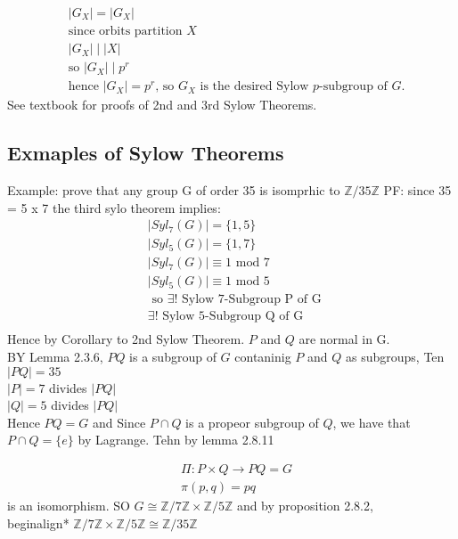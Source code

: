 \documentclass{article}
\begin{document}
\begin{align*}
    & |G_X|  = |G_X|  \\ 
    &  \text{since orbits partition } X \\
    & |G_X| \mid |X| \\ 
    & \text{so } |G_X| \mid p^r \\ 
    & \text{hence } |G_X| = p^r \text{, so } G_X \text{ is the desired Sylow } p \text{-subgroup of } G.
\end{align*}
See textbook for proofs of 2nd and 3rd Sylow Theorems.
\subsection{Exmaples of Sylow Theorems}

Example: prove that any group G of order 35 is isomprhic to $\mathbb{Z} / 35 \mathbb{Z}$ 
PF: since 35 = 5 x 7 the third sylo theorem implies: \begin{align*}
    &|Syl_7(G) | = \{1,5\} \\ 
    &|Syl_5(G) | = \{1,7\} \\ 
    &|Syl_7(G) | \equiv 1 \text{ mod } 7\\ 
    &|Syl_5(G) | \equiv 1  \text{ mod } 5 \\ 
    &\text{ so } \exists! \text{ Sylow 7-Subgroup P of G } \\ 
    &\exists! \text{ Sylow 5-Subgroup Q of G } \\ 
\end{align*}
Hence by Corollary to 2nd Sylow Theorem. $P$ and $Q$ are normal in G.  \\ BY Lemma 2.3.6, $PQ$ is a subgroup of $G$ contaninig $P$ and $Q$ as subgroups, Ten $|PQ| = 35$
\\ $|P| = 7 $ divides $|PQ| $
\\ $|Q| = 5 $ divides $|PQ| $
\\ Hence $PQ = G$ and Since $P \cap Q$ is a propeor subgroup of $Q$, we have that $P \cap Q = \{e\}$ by Lagrange. Tehn by lemma 2.8.11 

\begin{align*}
    &\Pi: P \times Q \to PQ = G \\ 
    &\pi(p,q) = pq
\end{align*} is an isomorphism. 
SO $G \cong \mathbb{Z} / 7\mathbb{Z} \times \mathbb{Z}/5\mathbb{Z}$ and by proposition 2.8.2, \\begin{align*}
    $\mathbb{Z} / 7\mathbb{Z} \times\mathbb{Z}/5\mathbb{Z} \cong \mathbb{Z}/35\mathbb{Z}$
\end{document}
